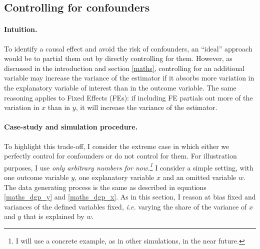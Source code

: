 \documentclass[usletter, 12pt]{article}
\begin{document}
		
		
		 \subsection{Controlling for confounders}
		
     			\paragraph{Intuition.} To identify a causal effect and avoid the risk of confounders, an ``ideal'' approach would be to partial them out by directly controlling for them. %
			However, as discussed in the introduction and section \ref{maths}, controlling for an additional variable may increase the variance of the estimator if it absorbs more variation in the explanatory variable of interest than in the outcome variable.
			The same reasoning applies to Fixed Effects (FEs): if including FE partials out more of the variation in $x$ than in $y$, it will increase the variance of the estimator.
			
			\paragraph{Case-study and simulation procedure.} To highlight this trade-off, I consider the extreme case in which either we perfectly control for confounders or do not control for them. For illustration purposes, I use \textit{only arbitrary numbers for now.\footnote{I will use a concrete example, as in other simulations, in the near future.}} I consider a simple setting, with one outcome variable $y$, one explanatory variable $x$ and an omitted variable $w$. The data generating process is the same as described in equations \ref{maths_dgp_y} and \ref{maths_dgp_x}. As in this section, I reason at bias fixed and variances of the defined variables fixed, \textit{i.e.} varying the share of the variance of $x$ and $y$ that is explained by $w$.
			
\end{document}
